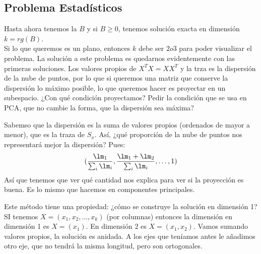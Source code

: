 \subsection{Problema Estadísticos}
Hasta ahora tenemos la $B$ y si $B\geq 0$, tenemos solución exacta en dimensión $k=rg(B)$.\\

\noindent
Si lo que queremos es un plano, entonces $k$ debe ser $2 o 3$ para poder visualizar el problema. La solución a este problema es quedarnos evidentemente con las primeras soluciones. Los valores propios de $X^TX = XX^T$ y la trza es la dispersión de la nube de puntos, por lo que si queremos una matriz que conserve la dispersión lo máximo posible, lo que queremos hacer es proyectar en un subespacio. ¿Con qué condición proyectamos? Pedir la condición que se usa en PCA, que no cambie la forma, que la dispersión sea máxima?

Sabemso que la dispersión es la suma de valores propios (ordenados de mayor a menor), que es la traza de $S_x$. Así, ¿qué proporción de la nube de puntos nos representará mejor la dispersión? Pues:
\begin{equation*}
    (\frac{\lm_1}{\sum_{i} \lm_i}, \frac{\lm_1+\lm_2}{\sum_{i} \lm_i}, \ldots, 1)
\end{equation*}
Así que tenemos que ver qué cantidad nos explica para ver si la proyección es buena. Es lo mismo que hacemos en componentes principales.

Este método tiene una propiedad: ¿cómo se construye la solución en dimensión 1? SI tenemos $X=(x_1,x_2,\ldots,x_k)$ (por columnas) entonces la dimensión en dimensión 1 es $X=(x_1)$. En dimensión 2 es $X=(x_1,x_2)$. Vamos sumando valores propios, la solución es anidada. A los ejes que teníamos antes le añadimos otro eje, que no tendrá la misma longitud, pero son ortogonales.\\

